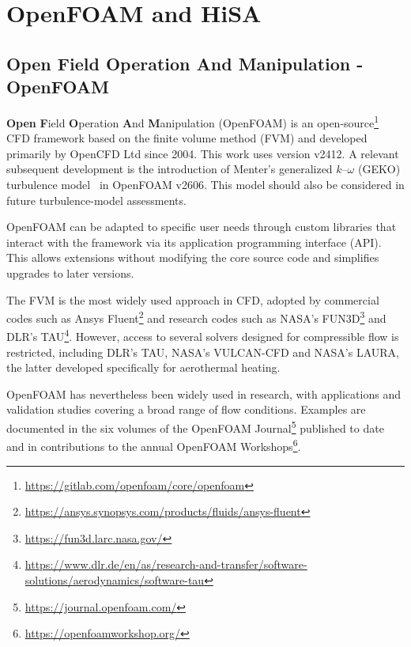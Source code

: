 \section{OpenFOAM and HiSA}
\label{sec:numerical-framework:openfoam-hisa}

\subsection{Open Field Operation And Manipulation - OpenFOAM}

\textbf{Open} \textbf{F}ield \textbf{O}peration \textbf{A}nd \textbf{M}anipulation (OpenFOAM) is an open-source\footnote{\url{https://gitlab.com/openfoam/core/openfoam}} CFD framework based on the finite volume method (FVM) and developed primarily by OpenCFD Ltd since 2004. This work uses version v2412. A relevant subsequent development is the introduction of Menter's generalized \(k\)--\(\omega\) (GEKO) turbulence model~\cite{menter2025GEKO} in OpenFOAM v2606. This model should also be considered in future turbulence-model assessments.
\par\medskip

OpenFOAM can be adapted to specific user needs through custom libraries that interact with the framework via its application programming interface (API). This allows extensions without modifying the core source code and simplifies upgrades to later versions.
\par\medskip

The FVM is the most widely used approach in CFD, adopted by commercial codes such as Ansys Fluent\footnote{\url{https://ansys.synopsys.com/products/fluids/ansys-fluent}} and research codes such as NASA's FUN3D\footnote{\url{https://fun3d.larc.nasa.gov/}} and DLR's TAU\footnote{\url{https://www.dlr.de/en/as/research-and-transfer/software-solutions/aerodynamics/software-tau}}. However, access to several solvers designed for compressible flow is restricted, including DLR's TAU, NASA's VULCAN-CFD and NASA's LAURA, the latter developed specifically for aerothermal heating.
\par\medskip

OpenFOAM has nevertheless been widely used in research, with applications and validation studies covering a broad range of flow conditions. Examples are documented in the six volumes of the OpenFOAM Journal\footnote{\url{https://journal.openfoam.com/}} published to date and in contributions to the annual OpenFOAM Workshops\footnote{\url{https://openfoamworkshop.org/}}.

